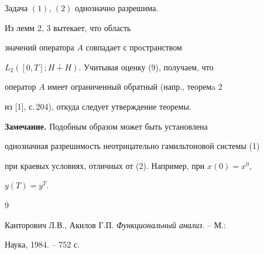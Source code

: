 \begin{thmnonum}


Задача $(1)$, $(2)$ однозначно разрешима.


\end{thmnonum}





\begin{pf}


Из лемм 2, 3 вытекает, что область


значений оператора $A$ совпадает с пространством


$L_{2}([0,T];H\dotplus H)$. Учитывая оценку (9), получаем, что


оператор $A$ имеет ограниченный обратный (напр., теоремa 2


из [1], с.\,204), откуда следует утверждение теоремы.


\end{pf}





{\bf Замечание.} Подобным образом может быть установлена


однозначная разрешимость неотрицательно гамильтоновой системы (1)


при краевых условиях, отличных от (2). Например, при $x(0)=x^{0}$,


$y(T)=y^{T}$.





\begin{thebibliography}{9}










Канторович Л.В., Акилов Г.П. {\em Функциональный анализ}. -- М.:


Наука, 1984. -- 752 с.








\end{thebibliography}





\vskip 2cm












\label{end}








